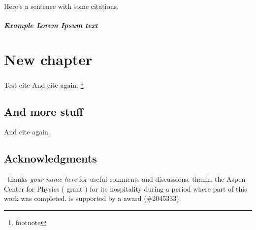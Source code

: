 \documentclass[12pt, oneside]{report}    %
\let\oldchapter\chapter
\def\chapter{%
  \setcounter{sidenote}{1}%
  \oldchapter
}
\begin{document}

Here's a sentence with some citations.\sidenote{
    \scriptsize\lipsum[10]}

\lipsum[1] \lipsum[1]



\paragraph{Example \emph{Lorem Ipsum} text} \lipsum[5]

% 
% 
% 
% 
% 



\chapter{New chapter}

Test cite\autocite{Feng:2016ijc}
\lipsum[1]
And cite again\autocite{Feng:2016ijc}.
 \lipsum[1]\footnote{footnote}

\section{And more stuff}
\lipsum[3]
And cite again\autocite{Feng:2016ijc}.

\section*{Acknowledgments}

\ thanks 
\emph{your name here}
for useful comments and discussions. 
%
 thanks 
    the Aspen Center for Physics ( grant )
    for 
    its 
    hospitality during a period where part of this work was completed. 
%
 is supported by a  award (\#2045333).



% 
\end{document}
